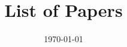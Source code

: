 \documentclass[12pt]{article}
\title{List of Papers}
\author{}
\date{\today}
\begin{document}
\maketitle

\begin{refsection}
    \nocite{john2025deep}  %
    \printbibliography[heading=subbibliography, title={2025}]
\end{refsection}

\begin{refsection}
    \nocite{alice2024transformer}  %
    \printbibliography[heading=subbibliography, title={2024}]
\end{refsection}
\end{document}
